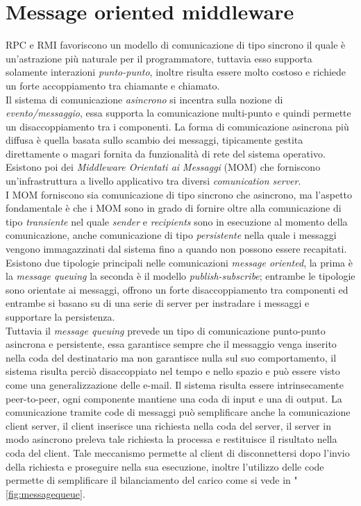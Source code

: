 \section{Message oriented middleware}\label{capitolo6}
RPC e RMI favoriscono un modello di comunicazione di tipo sincrono il quale è un'astrazione più naturale per il programmatore, tuttavia esso supporta solamente interazioni \emph{punto-punto}, inoltre risulta essere molto costoso e richiede un forte accoppiamento tra chiamante e chiamato.\\
Il sistema di comunicazione \emph{asincrono} si incentra sulla nozione di \emph{evento/messaggio}, essa supporta la comunicazione multi-punto e quindi permette un disaccoppiamento tra i componenti. La forma di comunicazione asincrona più diffusa è quella basata sullo scambio dei messaggi, tipicamente gestita direttamente o magari fornita da funzionalità di rete del sistema operativo. Esistono poi dei \emph{Middleware Orientati ai Messaggi} (MOM) che forniscono un'infrastruttura a livello applicativo tra diversi \emph{comunication server}.\\
I MOM forniscono sia comunicazione di tipo sincrono che asincrono, ma l'aspetto fondamentale è che i MOM sono in grado di fornire oltre alla comunicazione di tipo \emph{transiente} nel quale \emph{sender} e \emph{recipients} sono in esecuzione al momento della comunicazione, anche comunicazione di tipo \emph{persistente} nella quale i messaggi vengono immagazzinati dal sistema fino a quando non possono essere recapitati. Esistono due tipologie principali nelle comunicazioni \emph{message oriented}, la prima è la \emph{message queuing} la seconda è il modello \emph{publish-subscribe}; entrambe le tipologie sono orientate ai messaggi, offrono un forte disaccoppiamento tra componenti ed entrambe si basano su di una serie di server per instradare i messaggi e supportare la persistenza.\\
Tuttavia il \emph{message queuing} prevede un tipo di comunicazione punto-punto asincrona e persistente, essa garantisce sempre che il messaggio venga inserito nella coda del destinatario ma non garantisce nulla sul suo comportamento, il sistema risulta perciò disaccoppiato nel tempo e nello spazio e può essere visto come una generalizzazione delle e-mail.
Il sistema risulta essere intrinsecamente peer-to-peer, ogni componente mantiene una coda di input e una di output.
La comunicazione tramite code di messaggi può semplificare anche la comunicazione client server, il client inserisce una richiesta nella coda del server, il server in modo asincrono preleva tale richiesta la processa e restituisce il risultato nella coda del client. Tale meccanismo permette al client di disconnettersi dopo l'invio della richiesta e proseguire nella sua esecuzione, inoltre l'utilizzo delle code permette di semplificare il bilanciamento del carico come si vede in \figurename"\ref{fig:messagequeue}.
